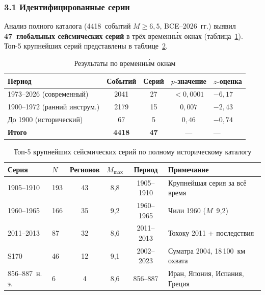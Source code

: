 \documentclass[12pt,a4paper]{article}
\begin{document}
\subsubsection*{3.1 Идентифицированные серии}

Анализ полного каталога (4418~событий $M\geq6{,}5$, BCE--2026~гг.)
выявил \textbf{47~глобальных сейсмических серий} в трёх временны́х окнах
(таблица~\ref{tab:epochs}).
Топ-5 крупнейших серий представлены в таблице~\ref{tab:top5}.

\begin{table}[H]
\centering
\caption{Результаты по временны́м окнам}
\label{tab:epochs}
\small
\begin{tabular}{lcccl}
\toprule
\textbf{Период} & \textbf{Событий} & \textbf{Серий} & \textbf{$p$-значение} & \textbf{$z$-оценка} \\
\midrule
1973--2026 (современный)         & 2041 & 27 & $<0{,}0001$ & $-6{,}17$ \\
1900--1972 (ранний инструм.)     & 2179 & 15 & $0{,}007$   & $-2{,}43$ \\
До 1900 (исторический)           &   67 &  5 & $0{,}46$    & $-0{,}74$ \\
\midrule
\textbf{Итого}                   & \textbf{4418} & \textbf{47} & --- & --- \\
\bottomrule
\end{tabular}
\end{table}

\begin{table}[H]
\centering
\caption{Топ-5 крупнейших сейсмических серий по полному историческому каталогу}
\label{tab:top5}
\small
\begin{tabular}{llcccl}
\toprule
\textbf{Серия} & \textbf{$N$} & \textbf{Регионов} & \textbf{$M_{\max}$}
            & \textbf{Период} & \textbf{Примечание} \\
\midrule
1905--1910 & 193 & 43 & 8,8 & 1905--1910 & Крупнейшая серия за всё время \\
1960--1965 & 166 & 35 & 9,2 & 1960--1965 & Чили 1960 ($M$~9,2) \\
2011--2013 &  87 & 32 & 8,6 & 2011--2013 & Тохоку 2011 + последствия \\
S170       &  46 & 12 & 9,1 & 2002--2023 & Суматра 2004, 18\,100~км охвата \\
856--887~н.\,э. & 6 & 4 & 8,6 & 856--887 & Иран, Япония, Испания, Греция \\
\bottomrule
\end{tabular}
\end{table}
\end{document}
